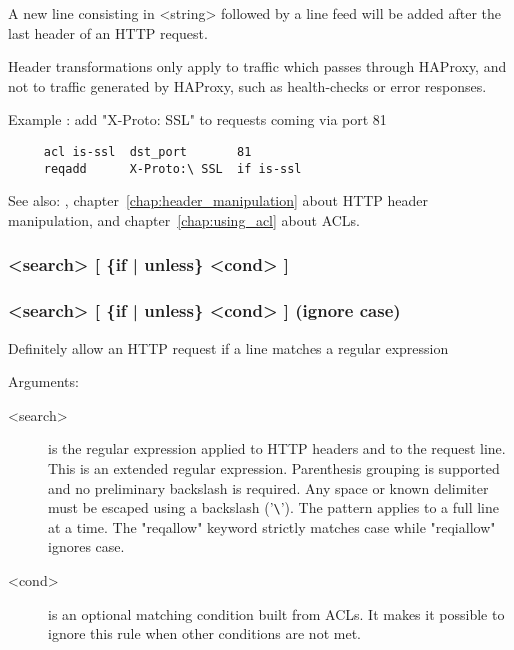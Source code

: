   A new line consisting in <string> followed by a line feed will be added after
  the last header of an HTTP request.

  Header transformations only apply to traffic which passes through HAProxy,
  and not to traffic generated by HAProxy, such as health-checks or error
  responses.

  Example : add "X-Proto: SSL" to requests coming via port 81
\begin{verbatim}
     acl is-ssl  dst_port       81
     reqadd      X-Proto:\ SSL  if is-ssl
\end{verbatim}


See also: , chapter~\ref{chap:header_manipulation} about HTTP header manipulation,
            and chapter~\ref{chap:using_acl} about ACLs.

\subsubsection[reqallow]{  <search> [ \{if | unless\} <cond> ]}
\subsubsection[reqiallow]{ <search> [ \{if | unless\} <cond> ] (ignore case)}


  Definitely allow an HTTP request if a line matches a regular expression


  Arguments:

\begin{description}
\item[<search>] is the regular expression applied to HTTP headers and to the
              request line. This is an extended regular expression. Parenthesis
              grouping is supported and no preliminary backslash is required.
              Any space or known delimiter must be escaped using a backslash
              ('\verb|\|'). The pattern applies to a full line at a time. The
              "reqallow" keyword strictly matches case while "reqiallow"
              ignores case.

\item[<cond>] is an optional matching condition built from ACLs. It makes it
              possible to ignore this rule when other conditions are not met.
\end{description}

